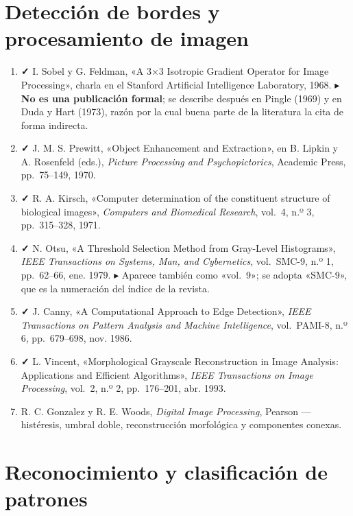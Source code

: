 \section{Detección de bordes y procesamiento de
imagen}\label{detecciuxf3n-de-bordes-y-procesamiento-de-imagen}

\begin{enumerate}
\def\labelenumi{\arabic{enumi}.}
\setcounter{enumi}{21}
\tightlist
\item
  \textbf{✓} I. Sobel y G. Feldman, «A 3×3 Isotropic Gradient Operator
  for Image Processing», charla en el Stanford Artificial Intelligence
  Laboratory, 1968. ▸ \textbf{No es una publicación formal}; se describe
  después en Pingle (1969) y en Duda y Hart (1973), razón por la cual
  buena parte de la literatura la cita de forma indirecta.
\item
  \textbf{✓} J. M. S. Prewitt, «Object Enhancement and Extraction», en
  B. Lipkin y A. Rosenfeld (eds.), \emph{Picture Processing and
  Psychopictorics}, Academic Press, pp.~75--149, 1970.
\item
  \textbf{✓} R. A. Kirsch, «Computer determination of the constituent
  structure of biological images», \emph{Computers and Biomedical
  Research}, vol.~4, n.º 3, pp.~315--328, 1971.
\item
  \textbf{✓} N. Otsu, «A Threshold Selection Method from Gray-Level
  Histograms», \emph{IEEE Transactions on Systems, Man, and
  Cybernetics}, vol.~SMC-9, n.º 1, pp.~62--66, ene. 1979. ▸ Aparece
  también como «vol.~9»; se adopta «SMC-9», que es la numeración del
  índice de la revista.
\item
  \textbf{✓} J. Canny, «A Computational Approach to Edge Detection»,
  \emph{IEEE Transactions on Pattern Analysis and Machine Intelligence},
  vol.~PAMI-8, n.º 6, pp.~679--698, nov. 1986.
\item
  \textbf{✓} L. Vincent, «Morphological Grayscale Reconstruction in
  Image Analysis: Applications and Efficient Algorithms», \emph{IEEE
  Transactions on Image Processing}, vol.~2, n.º 2, pp.~176--201, abr.
  1993.
\item
  R. C. Gonzalez y R. E. Woods, \emph{Digital Image Processing}, Pearson
  --- histéresis, umbral doble, reconstrucción morfológica y componentes
  conexas.
\end{enumerate}

\section{Reconocimiento y clasificación de
patrones}\label{reconocimiento-y-clasificaciuxf3n-de-patrones}

